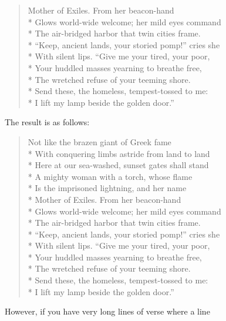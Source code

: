 \begin{Example}
\begin{lstcode}
\begin{verse}
    Mother of Exiles. From her beacon-hand\\*
    Glows world-wide welcome; her mild eyes command\\*
    The air-bridged harbor that twin cities frame.\\*
    ``Keep, ancient lands, your storied pomp!'' cries she\\*
    With silent lips. ``Give me your tired, your poor,\\*
    Your huddled masses yearning to breathe free,\\*
    The wretched refuse of your teeming shore.\\*
    Send these, the homeless, tempest-tossed to me:\\*
    I lift my lamp beside the golden door.''
  \end{verse}
\end{lstcode}
        The result is as follows:
        \begin{ShowOutput}
          \begin{verse}
            Not like the brazen giant of Greek fame\\*
            With conquering limbs astride from land to land\\*
            Here at our sea-washed, sunset gates shall stand\\*
            A mighty woman with a torch, whose flame\\*
            Is the imprisoned lightning, and her name\\*
            Mother of Exiles. From her beacon-hand\\*
            Glows world-wide welcome; her mild eyes command\\*
            The air-bridged harbor that twin cities frame.\\*
            ``Keep, ancient lands, your storied pomp!'' cries she\\*
            With silent lips. ``Give me your tired, your poor,\\*
            Your huddled masses yearning to breathe free,\\*
            The wretched refuse of your teeming shore.\\*
            Send these, the homeless, tempest-tossed to me:\\*
            I lift my lamp beside the golden door.''
          \end{verse}
        \end{ShowOutput}
      \fi
      However, if you have very long lines of verse where a line 

\end{Example}
